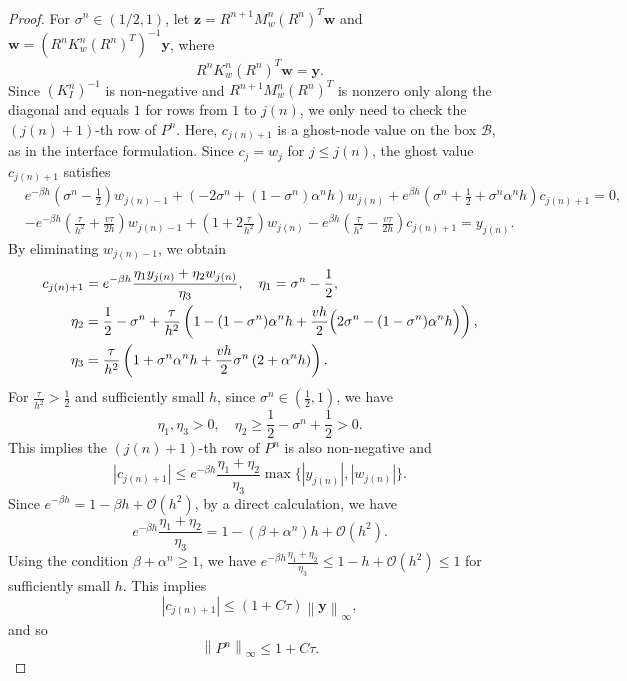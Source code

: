 \documentclass[10pt,a4paper]{amsart}
\newcommand{\abs}[1]{\left\lvert #1 \right\rvert}
\newcommand{\bm}[1]{\boldsymbol{#1}}
\newcommand{\mc}[1]{\mathcal{#1}}
\newcommand{\norm}[1]{\left\lVert #1 \right\rVert}
\newcommand{\paren}[1]{\left(#1\right)}
\begin{document}
\begin{proof}
For $\sigma^n \in (1/2,1)$, let
$\bm z=R^{n+1}M_w^n(R^n)^T\bm w$ and
$\bm w=(R^nK_w^n(R^n)^T)^{-1}\bm y$, where
\begin{equation}
    R^n K_w^n (R^n)^T \bm w = \bm y.
\end{equation}
Since $(K_I^n)^{-1}$ is non-negative and $R^{n+1} M_w^{n} (R^{n})^T$ is nonzero only along the diagonal and equals $1$ for rows from $1$ to $j(n)$, we only need to check the $(j(n)+1)$-th row of $P^n$. Here, $c_{j(n)+1}$ is a ghost-node value on the box $\mc B$, as in the interface formulation.
Since $c_j = w_j$ for $j \le j(n)$, the ghost value $c_{j(n)+1}$ satisfies
\begin{align}
    &e^{-\beta h}\paren{\sigma^n-\frac{1}{2}} w_{j(n)-1} + \paren{-2\sigma^n + \paren{1-\sigma^n}\alpha^n h}w_{j(n)} +e^{\beta h} \paren{\sigma^n + \frac{1}{2} + \sigma^n \alpha^n h} c_{j(n)+1} = 0,\\
    &- e^{-\beta h}\paren{\frac{\tau}{h^2}+\frac{v\tau}{2h}}w_{j(n)-1} + \paren{1+2\frac{\tau}{h^2}} w_{j(n)}  - e^{\beta h} \paren{\frac{\tau}{h^2} - \frac{v\tau}{2h}} c_{j(n)+1} = y_{j(n)}.
\end{align}
By eliminating $w_{j(n)-1}$, we obtain
\begin{align}
c_{j(n)+1} &= e^{-\beta h} \frac{\eta_1 y_{j(n)} + \eta_2 w_{j(n)}}{\eta_3}, \quad \eta_1 = \sigma^n-\frac{1}{2}, \\
    \eta_2 &= \frac{1}{2}-\sigma^n + \frac{\tau}{h^2} \paren{ 1-(1-\sigma^n)\alpha^nh+\frac{vh}{2}\Bigl(2\sigma^n-(1-\sigma^n)\alpha^nh\Bigr)},  \\
    \eta_3 &= \frac{\tau}{h^2}\paren{ 1+\sigma^n\alpha^nh + \frac{vh}{2} \sigma^n \paren{2+\alpha^nh}}.
\end{align}
For $\frac{\tau}{h^2}>\frac{1}{2}$ and sufficiently small $h$, since $\sigma^n\in (\frac{1}{2},1)$, we have
\begin{equation}
    \eta_1, \eta_3 > 0,\quad \eta_2 \ge \frac{1}{2}-\sigma^n + \frac{1}{2}>0.
\end{equation}
This implies the $(j(n)+1)$-th row of $P^n$ is also non-negative and
\begin{equation}
    \abs{c_{j(n)+1}} \le e^{-\beta h}\frac{\eta_1+\eta_2}{\eta_3}\max\{\abs{y_{j(n)}}, \abs{w_{j(n)}}\}.
\end{equation}
Since $e^{-\beta h} = 1 - \beta h + \mc O(h^2)$, by a direct calculation, we have
\begin{equation}
    e^{-\beta h} \frac{\eta_1+\eta_2}{\eta_3} = 1 - (\beta+\alpha^n)h + \mc O(h^2).
\end{equation}
Using the condition $\beta + \alpha^n \ge 1$, we have $e^{-\beta h} \frac{\eta_1+\eta_2}{\eta_3} \le 1 - h + \mc O(h^2) \le 1$ for sufficiently small $h$. This implies
\begin{equation}
    \abs{c_{j(n)+1}} \le \paren{1+C\tau}\norm{\bm y}_\infty,
\end{equation}
and so
\begin{equation}
    \norm{P^n}_\infty \le 1+C\tau.
\end{equation}
\end{proof}
\end{document}
